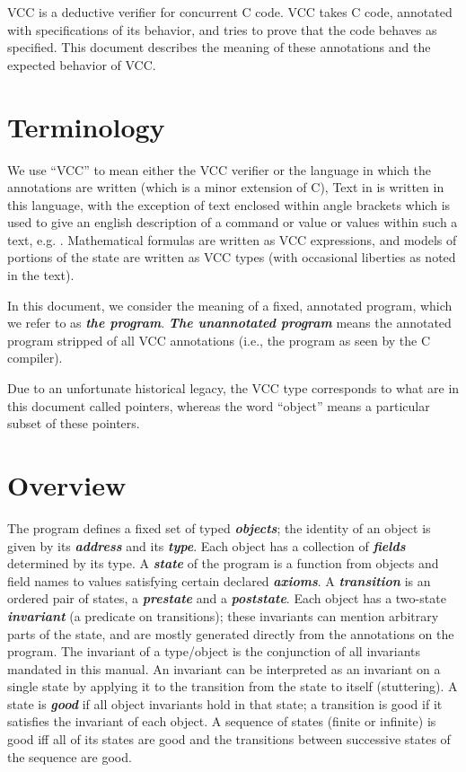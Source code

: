 \documentclass[preprint,nocopyrightspace]{sigplanconf}
\newcommand{\Def}[1]{\textit{\textbf{#1}}}
\begin{document}
\ifdense
\renewcommand{\labelitemi}{{\footnotesize \centeroncapheight{$\bullet$}}}
\fi

VCC is a deductive verifier for concurrent C code. VCC takes C code,
annotated with specifications of its behavior, and tries to prove that
the code behaves as specified. This document describes the meaning of these
annotations and the expected behavior of VCC. 

\section{Terminology}
We use ``VCC'' to mean either the VCC verifier or the language in
which the annotations are written (which is a minor extension of C),
Text in  is written in this language, with the
exception of text enclosed within angle brackets which is used to
give an english description of a command or value or values within
such a text, e.g. . Mathematical
formulas are written as VCC expressions, and models of portions of the
state are written as VCC types (with occasional liberties as noted in
the text). 

In this document, we consider the meaning of a fixed, annotated
program, which we refer to as \Def{the program}. \Def{The unannotated
program} means the annotated program stripped of all VCC annotations
(i.e., the program as seen by the C compiler).

Due to an unfortunate historical legacy, the VCC type \vcc{\object}
corresponds to what are in this document called pointers, whereas the
word ``object'' means a particular subset of these pointers.

\section{Overview}

The program defines a fixed set of typed \Def{objects}; the identity
of an object is given by its \Def{address} and its \Def{type}. Each
object has a collection of \Def{fields} determined by its type.
A \Def{state} of the program is a function from objects and field
names to values satisfying certain declared \Def{axioms}.
A \Def{transition} is an ordered pair of states, a \Def{prestate} and
a \Def{poststate}.  Each object has a two-state \Def{invariant} (a
predicate on transitions); these invariants can mention arbitrary
parts of the state, and are mostly generated directly from the
annotations on the program. The invariant of a type/object is the
conjunction of all invariants mandated in this manual.  An invariant
can be interpreted as an invariant on a single state by applying it to
the transition from the state to itself (stuttering). A state
is \Def{good} if all object invariants hold in that state; a
transition is good if it satisfies the invariant of each object. A
sequence of states (finite or infinite) is good iff all of its states
are good and the transitions between successive states of the sequence
are good.
\end{document}
